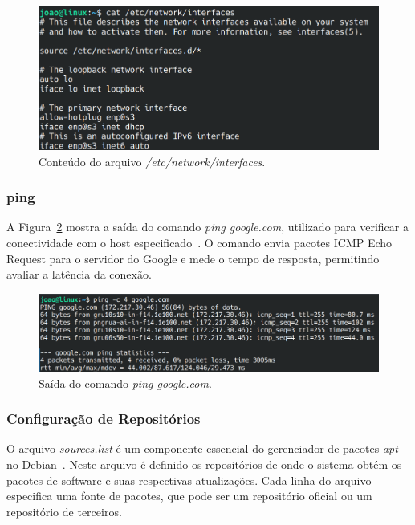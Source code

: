 \documentclass[
	12pt,				%
	oneside,   	        %
	a4paper,			%
	english,			%
	french,				%
	spanish,			%
	brazil,				%
	]{pacotes/abntex2}
\begin{document}
\begin{figure}[H]
  \centering
  \includegraphics[scale=0.37]{figuras/interfaces.png}
  \caption{Conteúdo do arquivo \textit{/etc/network/interfaces}.}
  \label{fig:interfaces}
\end{figure}

\subsubsection{ping}
A Figura~\ref{fig:ping} mostra a saída do comando \textit{ping google.com}, utilizado para verificar a conectividade com o host especificado~\cite{shotts2017}. O comando envia pacotes ICMP Echo Request para o servidor do Google e mede o tempo de resposta, permitindo avaliar a latência da conexão.

\begin{figure}[H]
  \centering
  \includegraphics[scale=0.37]{figuras/ping.png}
  \caption{Saída do comando \textit{ping google.com}.}
  \label{fig:ping}
\end{figure}

\subsubsection{Configuração de Repositórios}
O arquivo \textit{sources.list} é um componente essencial do gerenciador de pacotes \textit{apt} no Debian~\cite{guiafocaIniciante}. Neste arquivo é definido os repositórios de onde o sistema obtém os pacotes de software e suas respectivas atualizações. Cada linha do arquivo especifica uma fonte de pacotes, que pode ser um repositório oficial ou um repositório de terceiros.
\end{document}
